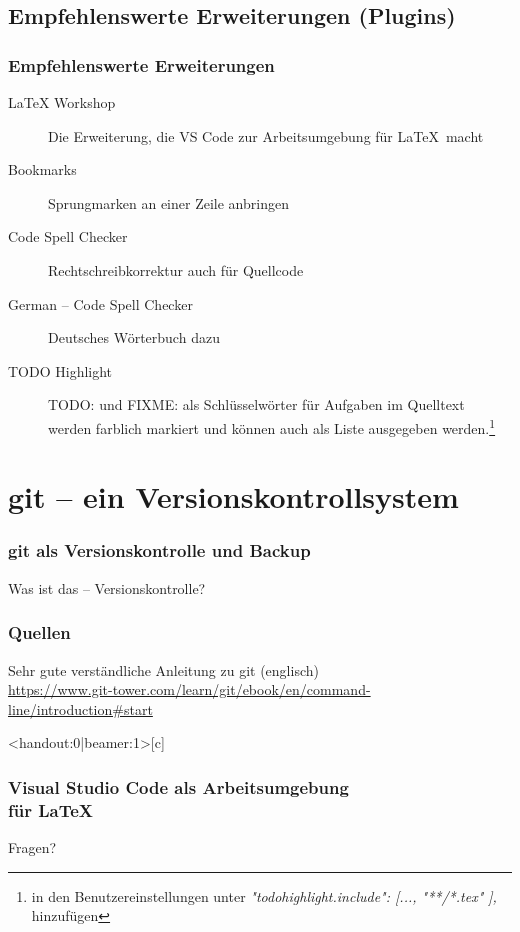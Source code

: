 \documentclass[t, %
							xcolor=dvipsnames,%
							hyperref={bookmarks,colorlinks},%
							]%
							{beamer}
\begin{document}
		\subsection{Empfehlenswerte Erweiterungen (Plugins)}
		\label{sub:EmpfehlenswerteErweiterungen}
		\begin{frame}
			\frametitle{Empfehlenswerte Erweiterungen}
			\begin{description}
				\item[LaTeX Workshop] Die Erweiterung, die VS Code zur Arbeitsumgebung für \LaTeX\ macht
				\item[Bookmarks] Sprungmarken an einer Zeile anbringen
				\item[Code Spell Checker] Rechtschreibkorrektur auch für Quellcode
				\item[German – Code Spell Checker]Deutsches Wörterbuch dazu
				\item[TODO Highlight] TODO: und FIXME: als Schlüsselwörter für Aufgaben im Quelltext werden farblich markiert und können auch als Liste ausgegeben werden.\footnote{in den Benutzereinstellungen unter \emph{"todohighlight.include": [...,					
					"**/*.tex"
			],} hinzufügen}
			\end{description}
		\end{frame}
	
	\section{git – ein Versionskontrollsystem}
	\label{sec:git-vcs}
	\begin{frame}
		\frametitle{git als Versionskontrolle und Backup}
		Was ist das – Versionskontrolle?
	\end{frame}

	\begin{frame}
		\frametitle{Quellen}
		Sehr gute verständliche Anleitung zu git (englisch)\\
		\url{https://www.git-tower.com/learn/git/ebook/en/command-line/introduction\#start}
	\end{frame}
	
%
		\begin{frame}<handout:0|beamer:1>[c]
		    \frametitle{Visual Studio Code als Arbeitsumgebung \\für \LaTeX}
				\centering
				\Huge{Fragen?}
		\end{frame}
\end{document}
